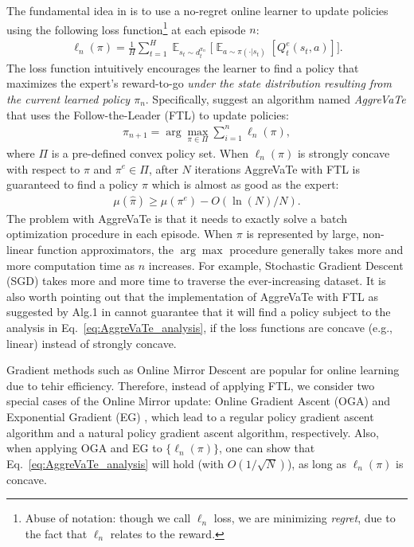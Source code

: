 \documentclass{article}
\newcommand{\BB}[1]{\textcolor{red}{\bf Byron: {#1}}}
\begin{document}
The fundamental idea in \citet{ross2014reinforcement} is to use a no-regret online learner to update policies using the following loss function\footnote{ Abuse of notation: though we call $\ell_n$ loss, we are minimizing \emph{regret}, due to the fact that $\ell_n$ relates to the reward.} at each episode $n$:
\begin{align}
\label{eq:general_loss}
\ell_{n}(\pi) = \frac{1}{H}\sum_{t=1}^H \mathop{\mathbb{E}}_{s_t\sim d_t^{\pi_n}}\Big[\mathop{\mathbb{E}}_{a \sim \pi(\cdot | s_t)}[Q_t^e(s_t,a)]\Big].
\end{align}
The loss function intuitively encourages the learner to find a policy that maximizes the expert's reward-to-go \emph{under the state distribution resulting from the current learned policy $\pi_n$}.
Specifically, \citet{ross2014reinforcement} suggest an algorithm named \emph{AggreVaTe} that uses the Follow-the-Leader (FTL)\cite{shalev2012online} to update policies:
\begin{align}
\pi_{n+1} = \arg\max_{\pi\in\Pi} \sum_{i=1}^{n}\ell_n(\pi),
\end{align} where $\Pi$ is a pre-defined convex policy set. 
When $\ell_n(\pi)$ is strongly concave with respect to $\pi$ and $\pi^e\in \Pi$, after $N$ iterations AggreVaTe with FTL is guaranteed to find a policy $\hat{\pi}$ which is almost as good as the expert:
\begin{align}
\label{eq:AggreVaTe_analysis}
\mu(\hat{\pi}) \geq \mu(\pi^e) - O(\ln(N)/{N}).
\end{align}
The problem with AggreVaTe is that it needs to exactly solve a batch optimization procedure in each episode. When $\pi$ is represented by large, non-linear function approximators, the $\arg\max$ procedure generally takes more and more computation time as $n$ increases. For example, Stochastic Gradient Descent (SGD) takes more and more time to traverse the ever-increasing dataset. 
It is also worth pointing out that the implementation of AggreVaTe with FTL as suggested by Alg.1 in \cite{ross2014reinforcement} cannot guarantee that it will find a policy subject to the analysis in Eq.~\ref{eq:AggreVaTe_analysis}, if the loss functions are concave (e.g., linear) instead of strongly concave.


Gradient methods such as Online Mirror Descent \cite{shalev2012online} are popular for online learning due to tehir efficiency. Therefore, instead of applying FTL, we consider two special cases of the Online Mirror update: Online Gradient Ascent (OGA) \cite{Zinkevich2003_ICML}  and Exponential Gradient (EG) \cite{shalev2012online}, which lead to a regular policy gradient ascent algorithm and a natural policy gradient ascent algorithm, respectively. Also, when applying OGA and EG to $\{\ell_n(\pi)\}$, one can show that Eq.~\ref{eq:AggreVaTe_analysis} will hold (with $O(1/\sqrt{N})$), as long as $\ell_n(\pi)$ is concave. 
\end{document}
